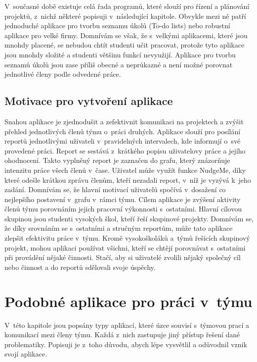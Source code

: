 V~současné době existuje celá řada programů, které slouží pro řízení a plánování projektů, z~nichž některé popisuji v~následující kapitole. Obvykle mezi ně patří jednoduché aplikace pro tvorbu seznamu úkolů (To-do lists) nebo robustní aplikace pro velké firmy. Domnívám se však, že s~velkými aplikacemi, které jsou mnohdy placené, se nebudou chtít studenti učit pracovat, protože tyto aplikace jsou mnohdy složité a studenti většinu funkcí nevyužijí. Aplikace pro tvorbu seznamů úkolů jsou zase příliš obecné a neprůkazné a není možné porovnat jednotlivé členy podle odvedené práce. 

\section{Motivace pro vytvoření aplikace}

Snahou aplikace je zjednodušit a zefektivnit komunikaci na projektech a zvýšit přehled jednotlivých členů týmu o~práci druhých. Aplikace slouží pro posílání reportů jednotlivými uživateli v~pravidelných intervalech, kde informují o~své provedené práci. Report se sestává z~krátkého popisu uživatelovy práce a jejího ohodnocení. Takto vyplněný report je zaznačen do grafu, který znázorňuje intenzitu práce všech členů v~čase. Uživatel může využít funkce NudgeMe, díky které odešle krátkou zprávu členům, kteří nezadali report, v~níž je vyzývá k~jeho zadání. Domnívám se, že hlavní motivací uživatelů spočívá v~dosažení co nejlepšího postavení v~grafu v~rámci týmu. Cílem aplikace je zvýšení aktivity členů týmu porovnáním jejich pracovní výkonnosti s~ostatními. Hlavní cílovou skupinou jsou studenti vysokých škol, kteří řeší skupinové projekty. Domnívám se, že díky srovnáním se s~ostatními a stručným reportům, může tato aplikace zlepšit efektivitu práce v~týmu. Kromě vysokoškoláků a~týmů řešících skupinový projekt, mohou aplikaci používat všichni, kteří se chtějí porovnávat s~ostatními při provádění nějaké činnosti. Stačí, aby si uživatelé zvolili nějaký společný cíl nebo činnost a do reportů sdělovali svoje úspěchy. 

\chapter{Podobné aplikace pro práci v~týmu} \label{apps}

V~této kapitole jsou popsány typy aplikací, které úzce souvisí s~týmovou prací a komunikací mezi členy týmu. Každá z~nich zastupuje jiný přístup řešení dané problematiky. Popisuji je z~toho důvodu, abych lépe vysvětlil a odůvodnil vznik svojí aplikace.


